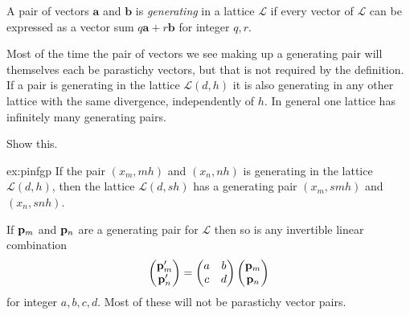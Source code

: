 \begin{definition} A pair of vectors $\mathbf{a}$ and $\mathbf{b}$
		   is \emph{generating} in a lattice $\mathcal{L}$ if every vector of $\mathcal{L}$ can be expressed as a vector sum $q\mathbf{a}+r\mathbf{b}$
		   for integer $q,r$.
\label{def:g}
\end{definition}
 Most of the time the pair of vectors we see making up a generating pair will themselves each be parastichy vectors, but that is not required by the definition. If a pair is generating in the lattice $\mathcal{L}(d,h)$ it is also generating in any other lattice with the same divergence, independently of $h$. In general one lattice has infinitely many generating pairs. 
\begin{jExercise}\label{ex:pinfgp}
	Show this.
\end{jExercise}
\begin{jAnswer}{ex:pinfgp}
	If the pair $(x_m, m h)$ and $(x_n,n h)$ is generating in the lattice $\mathcal{L}(d,h)$, then the lattice  $\mathcal{L}(d, s h )$ has a generating pair $(x_m, s m h)$ and $(x_n,s n h)$.
	
	If ${\mathbf p}_{m}$ and ${\mathbf p}_{n}$ are a generating pair for $\mathcal{L}$ then so is any invertible linear combination
	\begin{equation}
		\begin{pmatrix}
		{\mathbf p}_{m}' \\ {\mathbf p}_{n}' 
		\end{pmatrix}= 
	\begin{pmatrix}
		a & b  \\ c & d  
	\end{pmatrix}	\begin{pmatrix}
	{\mathbf p}_{m} \\ {\mathbf p}_{n} 
\end{pmatrix}
	\end{equation}
	for integer $a,b,c,d$. Most of these will not be parastichy vector pairs.
\end{jAnswer}

